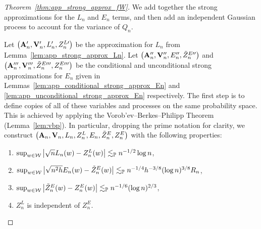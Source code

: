 \begin{proof}[Theorem~\ref{thm:app_strong_approx_fW}]

  We add together the strong approximations
  for the $L_n$ and $E_n$ terms,
  and then add an independent Gaussian process
  to account for the variance of $Q_n$.


  Let $\big(\mathbf{A}_n', \mathbf{V}_n', L_n', Z_n^{L\prime}\big)$
  be the approximation for $L_n$
  from Lemma~\ref{lem:app_strong_approx_Ln}.
  Let $\big(\mathbf{A}_n'', \mathbf{V}_n'', E_n'', \tilde Z_n^{E\prime\prime}\big)$
  and
  $\big(\mathbf{A}_n''', \mathbf{V}_n''', \tilde Z_n^{E\prime\prime\prime}, Z_n^{E\prime\prime\prime}\big)$
  be the conditional and unconditional strong approximations for $E_n$
  given in Lemmas~\ref{lem:app_conditional_strong_approx_En}
  and \ref{lem:app_unconditional_strong_approx_En}
  respectively.
  The first step is to define copies of all of these variables
  and processes on the same probability space.
  This is achieved by applying the
  Vorob'ev--Berkes--Philipp Theorem
  (Lemma~\ref{lem:vbp}).
  In particular, dropping the prime notation for clarity,
  we construct
  $\big(\mathbf{A}_n, \mathbf{V}_n, L_n, Z_n^L, E_n, \tilde Z_n^E, Z_n^E\big)$
  with the following properties:
  \begin{enumerate}[label=(\roman*)]

    \item
      $\sup_{w \in \mathcal{W}}
      \big| \sqrt{n} L_n(w) -  Z_n^L(w)\big|
      \lesssim_{\mathbb{P}} n^{-1/2} \log n$,

    \item
      $\sup_{w \in \mathcal{W}}
      \big|\sqrt{n^2h} E_n(w) - \tilde Z^E_n(w) \big|
      \lesssim_{\mathbb{P}} n^{-1/4}  h^{-3/8} (\log n)^{3/8} R_n$,

    \item
      $\sup_{w \in \mathcal{W}}
      \big| \tilde Z^E_n(w) - Z^E_n(w) \big|
      \lesssim_{\mathbb{P}} n^{-1/6} (\log n)^{2/3}$,

    \item
      $Z_n^L$ is independent of $Z_n^E$.


\end{enumerate}
\end{proof}
